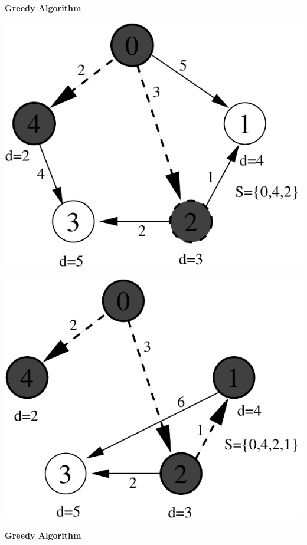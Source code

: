 \documentclass[a4,portraitt]{slides}
\begin{document}
{\newpage
{\samepage
\begin{center}
{\Large{\bf Greedy Algorithm}}
\end{center}

\begin{center}
\includegraphics{../Images/graphd.pdf}
\end{center}

\begin{center}
\includegraphics{../Images/graphe.pdf}
\end{center}
}

\newpage
{\samepage
\begin{center}
{\Large{\bf Greedy Algorithm}}
\end{center}

}}
\end{document}
